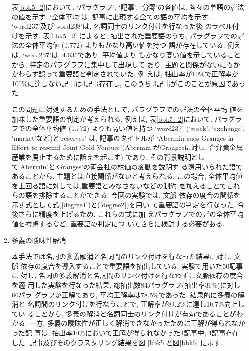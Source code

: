 \begin{enumerate}
\noindent
表\ref{bbk5_2}において, \hspace{-0.2mm}`パラグラフ', \hspace{-0.1mm}`記事', \hspace{-0.1mm}`分野'\hspace{-0.1mm}の各値は, \hspace{-0.1mm}各々の単語の\hspace{0.1mm}$\chi^2$法の値を示す.  \hspace{-0.1mm}`全体平均'\hspace{-0.1mm}は, 記事に出現する全ての語の平均を示す.
`{\sf word237}'及び`{\sf word238}'は, 名詞同士のリンク付けを行なった後
のラベル付けを示す.  表\ref{bbk5_2} によると, 抽出された重要語のうち, 
パラグラフでの$\chi^2$法の全体平均値 (1.772) よりもかなり高い値を持つ
語が存在している.  例えば, `{\sf word237}'は, 4.633であり, 平均値より
もかなり高い値を示していることから, 特定のパラグラフに集中して出現して
おり, 主題と関係がないにもかかわらず誤って重要語と判定されていた.  例
えば, 抽出率が10\%で正解率が100\%に達しない記事は4記事存在し, このうち
3記事がこのことが原因であった.

この問題に対処するための手法として, パラグラフでの$\chi^2$法の全体平均
値を加味した重要語の判定が考えられる.  例えば, 表\ref{bbk5_2}において, 
パラグラフでの全体平均値 (1.772) よりも高い値を持つ `{\sf word237}'
(`stock', `exchange', `market'など)と`reserves' は, 記事のタイトルが
`Abermin sues Granges in Effort to rescind Joint Gold Venture'(Abermin 
がGrangesに対し, 合弁貴金属産業を廃止するために訴えを起こす) であり, 
その背景説明として`Abermin'と`Granges'の両会社の株価の変動を説明す
る際用いられた語であることから, 主題とは直接関係がないと考えられる.
この場合, 全体平均値を上回る語に対しては,重要語とみなさないなどの制約
を加えることでこれらの語を排除することができる.  今回の実験では, 文脈
依存の度合の関係を示す式として式(\ref{degree1})と(\ref{degree2})を用い
て重要語の判定を行なった.  今後さらに精度を上げるため, これらの式に加
えパラグラフでの$\chi^{2}$の全体平均値を考慮するなど, 重要語の判定につ
いてさらに検討する必要がある.

\item 多義の曖昧性解消

本手法では名詞の多義解消と名詞間のリンク付けを行なった結果に対し, 文脈
依存の度合を導入することで重要語を抽出している.  実験で用いた50記事に
対し, 名詞の多義解消と名詞間のリンク付けを行なわずに文脈依存の度合を適
用した実験を行なった結果, 総抽出数84パラグラフ(抽出率30\%)に対し66パラ
グラフが正解であり, 平均正解率は78.5\%であった.  結果的に多義の解消と
名詞間のリンク付けを行なうことで, 正解率が89.2\%に達し10.7\%向上してい
ることから, 多義の解消と名詞同士のリンク付けが有効であることがわかる.
一方, 多義の曖昧性が正しく解消できなかったために正解が得られなかった記
事は, 抽出率10\%において正解が得られなかった4記事中, 1記事存在した.
記事及びそのクラスタリング結果を図 \ref{bbk5}と図\ref{bbk6} に示す.


\end{enumerate}
